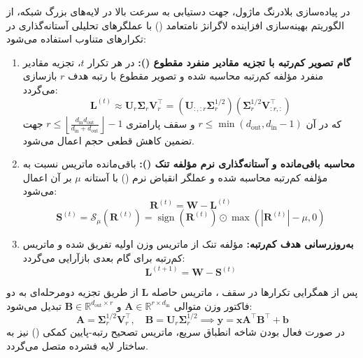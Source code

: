 در پیاده‌سازی بلادرنگ ماژول، جهت دستیابی به سرعت بالا در لایه‌های بزرگ شبکه، از الگوریتم بهینه‌سازی افزاینده لاگرانژ نامتعامد () با عملگرهای تحلیلی آستانه‌گذاری در تکرارهای متناوب استفاده می‌شود:

\begin{enumerate}
    \item \textbf{گام تصویر کم‌رتبه با تجزیه مقادیر منفرد مقطوع ():}
    در هر تکرار $t$، تجزیه مقادیر منفرد مؤلفه کم‌رتبه محاسبه شده و تصویر مقطوع با رتبه هدف $r$ بازسازی می‌گردد:
    \begin{equation}
    \mathbf{L}^{(t)} \approx \mathbf{U}_r \mathbf{\Sigma}_r \mathbf{V}_r^\top = \left(\mathbf{U}_{:, :r} \mathbf{\Sigma}_r^{1/2}\right) \left(\mathbf{\Sigma}_r^{1/2} \mathbf{V}_{:r, :}^\top\right)
    \end{equation}
    که در آن $r \le \min(d_{\text{out}}, d_{\text{in}} - 1)$ و سقف پارامتری $r \le \left\lfloor \frac{d_{\text{in}} d_{\text{out}}}{d_{\text{in}} + d_{\text{out}}} \right\rfloor - 1$ جهت تضمین کاهش قطعی حجم اعمال می‌شود.

    \item \textbf{محاسبه باقی‌مانده و آستانه‌گذاری نرم مؤلفه تنک ():}
    باقی‌مانده ماتریس نسبت به مؤلفه کم‌رتبه محاسبه شده و عملگر انقباض نرم () با آستانه $\mu$ بر آن اعمال می‌شود:
    \begin{equation}
    \mathbf{R}^{(t)} = \mathbf{W} - \mathbf{L}^{(t)}
    \end{equation}
    \begin{equation}
    \mathbf{S}^{(t)} = \mathcal{S}_{\mu}(\mathbf{R}^{(t)}) = \operatorname{sign}(\mathbf{R}^{(t)}) \odot \max(|\mathbf{R}^{(t)}| - \mu, 0)
    \end{equation}

    \item \textbf{به‌روزرسانی هدف کم‌رتبه:}
    مؤلفه تنک از ماتریس وزن اولیه تفریق شده و ماتریس کم‌رتبه برای گام بعدی بازآرایی می‌گردد:
    \begin{equation}
    \mathbf{L}^{(t+1)} = \mathbf{W} - \mathbf{S}^{(t)}
    \end{equation}
\end{enumerate}

پس از همگرایی تکرارها در سقف ، ماتریس حاصله $\mathbf{L}$ از طریق تجزیه دومرحله‌ای به دو فاکتور وزن متوالی $\mathbf{A} \in \mathbb{R}^{r \times d_{\text{in}}}$ و $\mathbf{B} \in \mathbb{R}^{d_{\text{out}} \times r}$ تبدیل می‌شود:
\begin{equation}
\mathbf{A} = \mathbf{\Sigma}_r^{1/2} \mathbf{V}_r^\top, \quad \mathbf{B} = \mathbf{U}_r \mathbf{\Sigma}_r^{1/2} \implies \mathbf{y} = \mathbf{x} \mathbf{A}^\top \mathbf{B}^\top + \mathbf{b}
\end{equation}
در صورت فعال بودن شاخه انطباق سریع، ماتریس تصحیح رتبه-پایین کمکی () نیز به ساختار لایه فشرده متصل می‌گردد.

